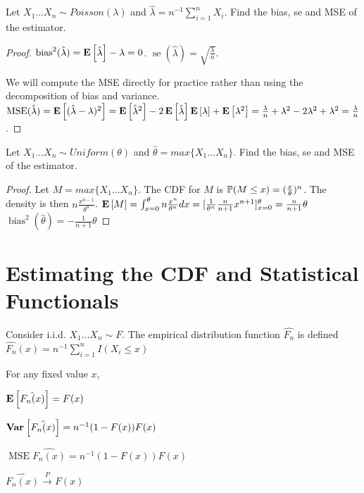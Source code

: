 \documentclass[10pt]{article}
\begin{document}
\begin{exercise}
    Let $X_1 \dots X_n \sim Poisson(\lambda)$ and $\hat{\lambda} = n^{-1}\sum_{i=1}^n
    X_i$. Find the bias, se and MSE of the estimator.
\end{exercise}

\begin{proof}
    $\operatorname{bias}^2(\hat{\lambda}) = \E{\hat{\lambda}} - \lambda = 0$.
    $\operatorname{se}(\hat{\lambda}) = \sqrt{\frac{\lambda}{n}}$.

    We will compute the MSE directly for practice rather than using the
    decomposition of bias and variance. $\operatorname{MSE}(\hat{\lambda}) =
    \E{(\hat{\lambda} - \lambda)^2} = \E{\hat{\lambda}^2} -
    2\E{\hat{\lambda}}\E{\lambda} + \E{\lambda^2} = \frac{\lambda}{n} +
    \lambda^2 - 2\lambda^2 + \lambda^2 = \frac{\lambda}{n}$.
\end{proof}

\begin{exercise}
    Let $X_1 \dots X_n \sim Uniform(\theta)$ and $\hat{\theta} = max\{X_1 \dots
    X_n\}$. Find the bias, se and MSE of the estimator.
\end{exercise}

\begin{proof}
    Let $M = max\{X_1 \dots X_n\}$. The CDF for $M$ is $\P(M \leq x) =
    (\frac{x}{\theta})^n$. The density is then $n\frac{x^{n-1}}{\theta^n}$.
    $\E{M} = \int_{x=0}^{\theta} n \frac{x^{n}}{\theta^n} dx =
    [\frac{1}{\theta^n}\frac{n}{n+1}x^{n+1}]_{x=0}^{\theta} = \frac{n}{n+1}\theta$
    $\operatorname{bias}^2(\hat{\theta}) = -\frac{1}{n+1}\theta$
\end{proof}

\section{Estimating the CDF and Statistical Functionals}

\begin{definition}
    Consider i.i.d. $X_1 \dots X_n \sim F$. The empirical distribution function
    $\hat{F_n}$ is defined $\hat{F_n}(x) = n^{-1}\sum_{i=1}^n I(X_i \leq x)$
\end{definition}

\begin{theorem}
    For any fixed value $x$,

    $\E{\hat{F_n(x)}} = F(x)$

    $\Var{\hat{F_n(x)}} = n^{-1}(1-F(x))F(x)$

    $\operatorname{MSE}{\hat{F_n(x)}} = n^{-1}(1-F(x))F(x)$

    $\hat{F_n(x)} \xrightarrow{P} F(x)$
\end{theorem}
\end{document}
